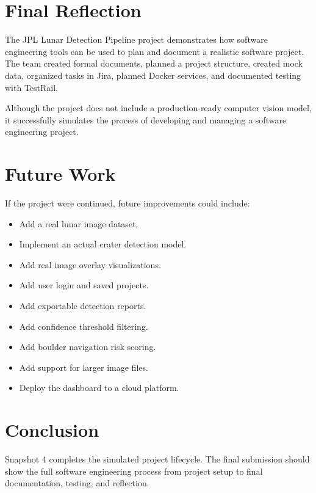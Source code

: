 \documentclass[12pt]{article}
\begin{document}
\section{Final Reflection}

The JPL Lunar Detection Pipeline project demonstrates how software engineering tools can be used to plan and document a realistic software project. The team created formal documents, planned a project structure, created mock data, organized tasks in Jira, planned Docker services, and documented testing with TestRail.

Although the project does not include a production-ready computer vision model, it successfully simulates the process of developing and managing a software engineering project.

\section{Future Work}

If the project were continued, future improvements could include:

\begin{itemize}
    \item Add a real lunar image dataset.
    \item Implement an actual crater detection model.
    \item Add real image overlay visualizations.
    \item Add user login and saved projects.
    \item Add exportable detection reports.
    \item Add confidence threshold filtering.
    \item Add boulder navigation risk scoring.
    \item Add support for larger image files.
    \item Deploy the dashboard to a cloud platform.
\end{itemize}

\section{Conclusion}

Snapshot 4 completes the simulated project lifecycle. The final submission should show the full software engineering process from project setup to final documentation, testing, and reflection.
\end{document}
